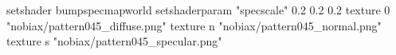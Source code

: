 setshader bumpspecmapworld
setshaderparam "specscale" 0.2 0.2 0.2
   texture 0 "nobiax/pattern045_diffuse.png"
   texture n "nobiax/pattern045_normal.png"
   texture s "nobiax/pattern045_specular.png"